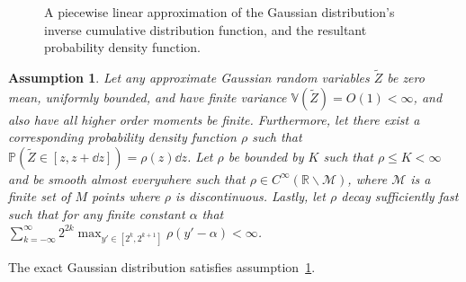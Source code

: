 \documentclass[manuscript,review]{acmart}
\newtheorem{assumption}{Assumption}[section]
\begin{document}
\begin{figure}[htb]
\centering
\hfil
{}\hfil
{}\hfil

\caption{A piecewise linear approximation of the Gaussian distribution's inverse cumulative distribution function, and the resultant probability density function.}
\label{fig:piecewise_linear_approximation}

\end{figure}

\begin{assumption}
\label{asmp:approximate_random_variables}
Let any approximate Gaussian random variables $ \widetilde{Z} $ be zero mean, uniformly bounded, and have finite variance $ \mathbb{V}(\widetilde{Z}) = O(1) < \infty  $, and also have all higher order moments be finite. Furthermore, let there exist a corresponding probability density function $ \rho $ such that $ \mathbb{P}(\widetilde{Z} \in [z, z + \dd{z}]) = \rho(z) \dd{z}$.  Let $ \rho $ be bounded by $ K $ such that $ \rho \leq K < \infty $ and be smooth almost everywhere such that $ \rho \in C^\infty(\mathbb{R}\backslash\mathcal{M})$, where $ \mathcal{M} $ is a finite set of $ M $ points where $ \rho $ is discontinuous. Lastly, let $ \rho $ decay sufficiently fast such that for any finite constant $ \alpha $ that $ \sum_{k=-\infty}^\infty 2^{2k} \max_{y'\in[2^{k}, 2^{k+1}]} \rho(y'-\alpha) < \infty $.
\end{assumption}

\begin{lemma}
\label{lemma:exact_gaussian_distribution}
The exact Gaussian distribution satisfies assumption~\ref{asmp:approximate_random_variables}.
\end{lemma}
\end{document}
